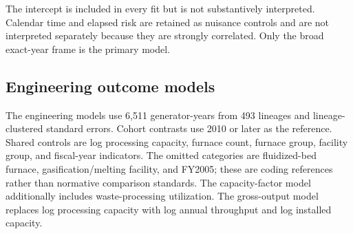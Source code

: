 \documentclass[12pt,a4paper]{article}
\begin{document}
The intercept is included in every fit but is not substantively interpreted.
Calendar time and elapsed risk are retained as nuisance controls and are not
interpreted separately because they are strongly correlated. Only the broad
exact-year frame is the primary model.

\clearpage
\subsection{Engineering outcome models}

The engineering models use 6,511 generator-years from 493 lineages and
lineage-clustered standard errors. Cohort contrasts use 2010 or later as the
reference. Shared controls are log processing capacity, furnace count, furnace
group, facility group, and fiscal-year indicators. The omitted categories are
fluidized-bed furnace, gasification/melting facility, and FY2005; these are
coding references rather than normative comparison standards. The
capacity-factor model additionally includes waste-processing utilization. The
gross-output model replaces log processing capacity with log annual throughput
and log installed capacity.
\end{document}
